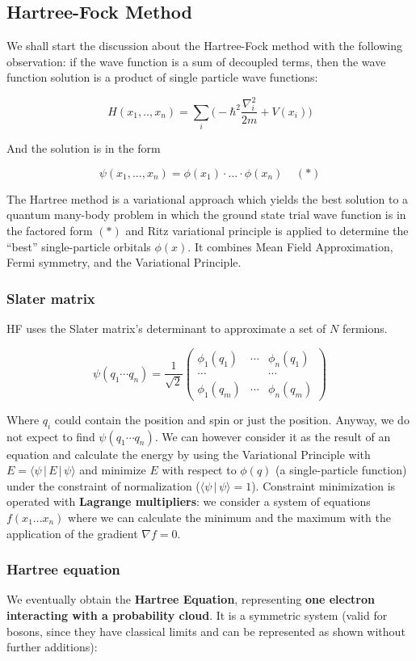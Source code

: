 	\subsection{Hartree-Fock Method}
	We shall start the discussion about the Hartree-Fock method with the following observation: if the wave function is a sum of decoupled terms, then the wave function solution is a product of single particle wave functions:

	$$H(x_1,.., x_n) = \sum_i \bigg(-\hbar^2 \frac{\nabla_i^2}{2m} + V(x_i) \bigg)$$

	And the solution is in the form

	$$\psi(x_1, ..., x_n) = \phi(x_1) \cdot ... \cdot \phi(x_n) \;\;\;\; (*)$$

	The Hartree method is a variational approach which yields the best solution to a quantum many-body problem in which the ground state trial wave function is in the factored form $(*)$ and Ritz variational principle is applied to determine the “best” single-particle orbitals $\phi(x)$.
	It combines Mean Field Approximation, Fermi symmetry, and the Variational Principle.

		\subsubsection{Slater matrix}
		HF uses the Slater matrix's determinant to approximate a set of $N$ fermions.

		$$\psi(q_1\cdots q_n)=\frac{1}{\sqrt{2}}\begin{pmatrix}\phi_1(q_1)&\cdots&\phi_n(q_1)\\\cdots & &\cdots\\\phi_1(q_m)&\cdots&\phi_n(q_m)\end{pmatrix}$$

		Where $q_i$ could contain the position and spin or just the position. Anyway, we do not expect to find $\psi(q_1\cdots q_n)$.
		We can however consider it as the result of an equation and calculate the energy by using the Variational Principle with $E=\langle \psi\,|\,E\,|\,\psi \rangle$ and minimize $E$ with respect to $\phi(q)$ (a single-particle function) under the constraint of normalization ($\langle \psi\,|\,\psi \rangle =1$).
		Constraint minimization is operated with \textbf{Lagrange multipliers}: we consider a system of equations $f(x_1...x_n)$ where we can calculate the minimum and the maximum with the application of the gradient $\nabla f=0$.\\

		\subsubsection{Hartree equation}
		We eventually obtain the \textbf{Hartree Equation}, representing \textbf{one electron interacting with a probability cloud}.
		It is a symmetric system (valid for bosons, since they have classical limits and can be represented as shown without further additions):

